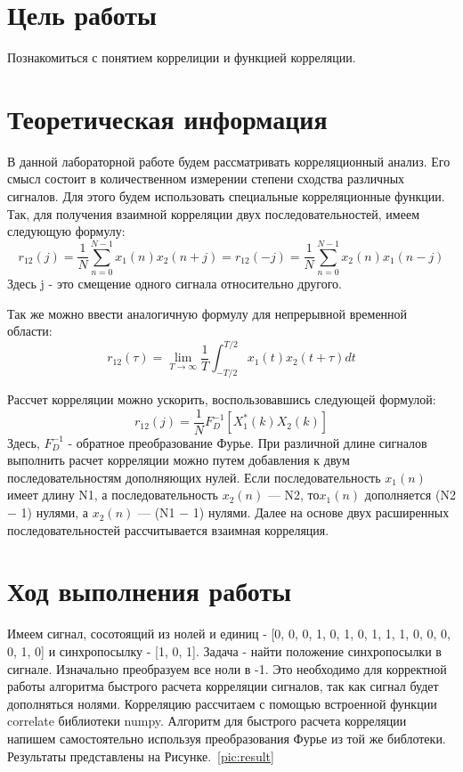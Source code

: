 
\usepackage{amsmath}







\section{Цель работы}
Познакомиться с понятием коррелиции и функцией корреляции. 


\section{Теоретическая информация}
В данной лабораторной работе будем рассматривать корреляционный анализ. Его смысл состоит в количественном измерении степени сходства различных сигналов. Для этого будем использовать специальные корреляционные функции. Так, для получения взаимной корреляции двух последовательностей, имеем следующую формулу:
\begin{equation} r_{12}(j) = \frac{1}{N} \sum\limits_{n = 0}^{N - 1} x_1(n) x_2(n + j) = r_{12}(-j) =  \frac{1}{N} \sum\limits_{n = 0}^{N - 1} x_2(n) x_1(n - j) \end{equation}
Здесь j - это смещение одного сигнала относительно другого.

Так же можно ввести аналогичную формулу для непрерывной временной области:
\begin{equation} r_{12}(\tau) =  \lim_{T \to \infty} \frac{1}{T} \int_{-T/2}^{T/2} x_1(t)x_2(t + \tau) dt  \end{equation}

Рассчет корреляции можно ускорить, воспользовавшись следующей формулой:
\begin{equation} r_{12}(j) = \frac{1}{N}F_D^{-1}[X_1^*(k)X_2(k)] \end{equation}
Здесь, $F_D^{-1}$ - обратное преобразование Фурье.
При различной длине сигналов выполнить расчет корреляции можно путем добавления к двум последовательностям дополняющих нулей. Если последовательность $x_1(n)$ имеет
длину N1, а последовательность $x_2(n)$ — N2, то$x_1(n)$ дополняется (N2 − 1) нулями,
а $x_2(n)$ — (N1 − 1) нулями. Далее на основе двух расширенных последовательностей
рассчитывается взаимная корреляция.

\section{Ход выполнения работы}
Имеем сигнал, сосотоящий из нолей и единиц - [0, 0, 0, 1, 0, 1, 0, 1, 1, 1, 0, 0, 0, 0, 1, 0] и синхропосылку - [1, 0, 1]. Задача - найти положение синхропосылки в сигнале. Изначально преобразуем все ноли в -1. Это необходимо для корректной работы алгоритма быстрого расчета корреляции сигналов, так как сигнал будет дополняться нолями. Корреляцию рассчитаем с помощью встроенной функции correlate библиотеки numpy. Алгоритм для быстрого расчета корреляции напишем самостоятельно используя преобразования Фурье из той же библотеки. Результаты представлены на Рисунке.~\ref{pic:result}


